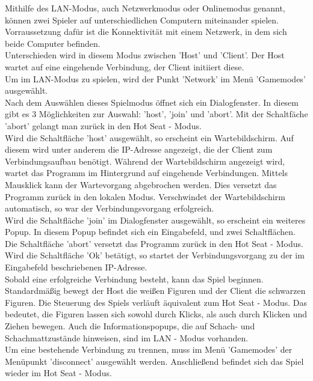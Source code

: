 \documentclass[12pt,a4paper]{article}
\begin{document}
Mithilfe des LAN-Modus, auch Netzwerkmodus oder Onlinemodus genannt, können zwei Spieler auf unterschiedlichen Computern miteinander spielen.\\
Vorraussetzung dafür ist die Konnektivität mit einem Netzwerk, in dem sich beide Computer befinden. \\
Unterschieden wird in diesem Modus zwischen 'Host' und 'Client'. Der Host wartet auf eine eingehende Verbindung, der Client initiiert diese.\\
Um im LAN-Modus zu spielen, wird der Punkt 'Network' im Menü 'Gamemodes' ausgewählt.\\
Nach dem Auswählen dieses Spielmodus öffnet sich ein Dialogfenster. In diesem gibt es 3 Möglichkeiten zur Auswahl: 'host', 'join' und 'abort'. Mit der Schaltfäche 'abort' gelangt man zurück in den Hot Seat - Modus. \\
Wird die Schaltfläche 'host' ausgewählt, so erscheint ein Wartebildschirm. Auf diesem wird unter anderem die IP-Adresse angezeigt, die der Client zum Verbindungsaufbau benötigt. Während der Wartebildschirm angezeigt wird, wartet das Programm im Hintergrund auf eingehende Verbindungen. Mittels Mausklick kann der Wartevorgang abgebrochen werden. Dies versetzt das Programm zurück in den lokalen Modus. Verschwindet der Wartebildschirm automatisch, so war der Verbindungsvorgang erfolgreich. \\
Wird die Schaltfläche 'join' im Dialogfenster ausgewählt, so erscheint ein weiteres Popup. In diesem Popup befindet sich ein Eingabefeld, und zwei Schaltflächen.\\
Die Schaltfläche 'abort' versetzt das Programm zurück in den Hot Seat - Modus.\\
Wird die Schaltfläche 'Ok' betätigt, so startet der Verbindungsvorgang zu der im Eingabefeld beschriebenen IP-Adresse.\\[2ex]
Sobald eine erfolgreiche Verbindung besteht, kann das Spiel beginnen. Standardmäßig bewegt der Host die weißen Figuren und der Client die schwarzen Figuren. Die Steuerung des Spiels verläuft äquivalent zum Hot Seat - Modus. Das bedeutet, die Figuren lassen sich sowohl durch Klicks, als auch durch Klicken und Ziehen bewegen. Auch die Informationspopups, die auf Schach- und Schachmattzustände hinweisen, sind im LAN - Modus vorhanden.\\
Um eine bestehende Verbindung zu trennen, muss im Menü 'Gamemodes' der Menüpunkt 'disconnect' ausgewählt werden. Anschließend befindet sich das Spiel wieder im Hot Seat - Modus. 
\end{document}
